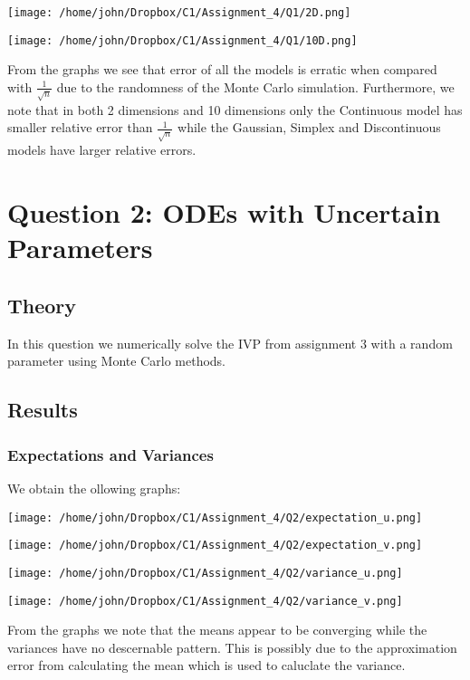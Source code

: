 \documentclass[letterpaper,12pt]{article}
\begin{document}
\centerline{\texttt{[image: /home/john/Dropbox/C1/Assignment\_4/Q1/2D.png]}}

\centerline{\texttt{[image: /home/john/Dropbox/C1/Assignment\_4/Q1/10D.png]}}

From the graphs we see that error of all the models is erratic when compared with $\frac{1}{\sqrt{n}}$ due to the randomness of the Monte Carlo simulation. Furthermore, we note that in both 2 dimensions and 10 dimensions only the Continuous model has smaller relative error than $\frac{1}{\sqrt{n}}$ while the Gaussian, Simplex and Discontinuous models have larger relative errors.


\section{Question 2: ODEs with Uncertain Parameters}

\subsection{Theory}

In this question we numerically solve the IVP from assignment 3 with a random parameter using Monte Carlo methods. 

\subsection{Results}

\subsubsection{Expectations and Variances}

We obtain the ollowing graphs:

\centerline{\texttt{[image: /home/john/Dropbox/C1/Assignment\_4/Q2/expectation\_u.png]}}

\centerline{\texttt{[image: /home/john/Dropbox/C1/Assignment\_4/Q2/expectation\_v.png]}}


\centerline{\texttt{[image: /home/john/Dropbox/C1/Assignment\_4/Q2/variance\_u.png]}}


\centerline{\texttt{[image: /home/john/Dropbox/C1/Assignment\_4/Q2/variance\_v.png]}}

From the graphs we note that the means appear to be converging while the variances have no descernable pattern. This is possibly due to the approximation error from calculating the mean which is used to caluclate the variance.
\end{document}

